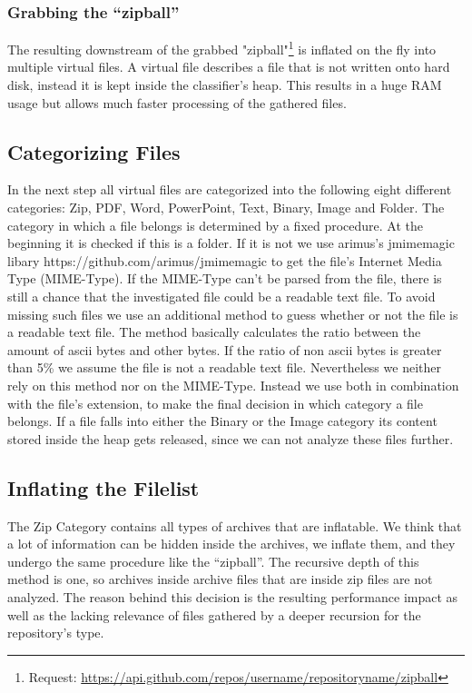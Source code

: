 \documentclass[paper=A4,pagesize=auto,12pt,headinclude=true,footinclude=true,BCOR=0mm,DIV=calc]{scrartcl}
\begin{document}
	\subsubsection{ Grabbing the “zipball”}
	
	
	The resulting downstream of the grabbed "zipball"\footnote{Request: \url{https://api.github.com/repos/username/repositoryname/zipball}} is inflated on the fly into multiple virtual files. A virtual file describes a file that is not written onto hard disk, instead it is kept inside the classifier’s heap. This results in a huge RAM usage but allows much faster processing of the gathered files.
	
	\subsection{Categorizing Files}
	
	In the next step all virtual files are categorized into the following eight different categories: Zip, PDF, Word, PowerPoint, Text, Binary, Image and Folder. The category in which a file belongs is determined by a fixed procedure. 
	At the beginning it is checked if this is a folder. If it is not we use arimus’s jmimemagic libary https://github.com/arimus/jmimemagic to get the file’s Internet Media Type (MIME-Type). If the MIME-Type can’t be parsed from the file, there is still a chance that the investigated file could be a readable text file. To avoid missing such files we use an additional method to guess whether or not the file is a readable text file. The method basically calculates the ratio between the amount of ascii bytes and other bytes. If the ratio of non ascii bytes is greater than 5\% we assume the file is not a readable text file. Nevertheless we neither rely on this method nor on the MIME-Type. Instead we use both in combination with the file’s extension, to make the final decision in which category a file belongs. If a file falls into either the Binary or the Image category its content stored inside the heap gets released, since we can not analyze these files further.
	
	\subsection{Inflating the Filelist}
	
	The Zip Category contains all types of archives that are inflatable. We think that a lot of information can be hidden inside the archives, we inflate them, and they undergo the same procedure like the “zipball”. The recursive depth of this method is one, so archives inside archive files that are inside zip files are not analyzed. The reason behind this decision is the resulting performance impact as well as the lacking relevance of files gathered by a deeper recursion for the repository’s type.
	
\end{document}
